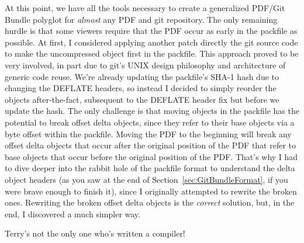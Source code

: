 \documentclass{article}
\begin{document}
At this point, we have all the tools necessary to create a generalized
PDF/Git Bundle polyglot for \emph{almost} any PDF and git
repository. The only remaining hurdle is that some viewers require
that the PDF occur as early in the packfile as possible. At first, I
considered applying another patch directly the git source code to make
the uncompressed object first in the packfile. This approach proved to
be very involved, in part due to git's UNIX design philosophy and
architecture of generic code reuse. We're already updating the
packfile's SHA-1 hash due to changing the DEFLATE headers, so instead
I decided to simply reorder the objects after-the-fact, subsequent to
the DEFLATE header fix but before we update the hash. The only
challenge is that moving objects in the packfile has the potential to
break offset delta objects, since they refer to their base objects via
a byte offset within the packfile.  Moving the PDF to the beginning
will break any offset delta objects that occur after the original
position of the PDF that refer to base objects that occur before the
original position of the PDF. That's why I had to dive deeper into the
rabbit hole of the packfile format to understand the delta object
headers (as you saw at the end of Section~\ref{sec:GitBundleFormat},
if you were brave enough to finish it), since I originally attempted
to rewrite the broken ones. Rewriting the broken offset delta objects
is the \emph{correct} solution, but, in the end, I discovered a much
simpler way.

\begin{center}
\end{center}

Terry's not the only one who's written a compiler!
\end{document}
